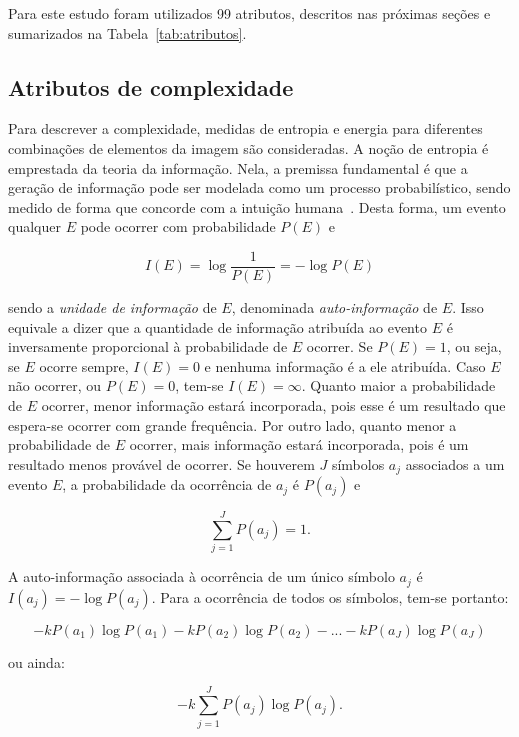 Para este estudo foram utilizados 99 atributos, descritos nas próximas seções e
sumarizados na Tabela~\ref{tab:atributos}.

\subsection{Atributos de complexidade}

Para descrever a complexidade, medidas de entropia e energia para diferentes
combinações de elementos da imagem são consideradas. A noção de entropia é
emprestada da teoria da informação. Nela, a premissa fundamental é que a
geração de informação pode ser modelada como um processo probabilístico, sendo
medido de forma que concorde com a intuição humana~\cite{gonzalez}. Desta forma,
um evento qualquer $E$ pode ocorrer com probabilidade $P(E)$ e

\begin{equation}
  I(E) = \log\frac{1}{P(E)} = -\log P(E)
\end{equation}

\noindent sendo a \emph{unidade de informação} de $E$, denominada
\emph{auto-informação} de $E$. Isso equivale a dizer que a quantidade de
informação atribuída ao evento $E$ é inversamente proporcional à probabilidade
de $E$ ocorrer. Se $P(E) = 1$, ou seja, se $E$ ocorre sempre, $I(E) = 0$ e
nenhuma informação é a ele atribuída. Caso $E$ não ocorrer, ou $P(E) = 0$,
tem-se $I(E) = \infty$. Quanto maior a probabilidade de $E$ ocorrer, menor
informação estará incorporada, pois esse é um resultado que espera-se ocorrer
com grande frequência. Por outro lado, quanto menor a probabilidade de $E$
ocorrer, mais informação estará incorporada, pois é um resultado menos provável
de ocorrer. Se houverem $J$ símbolos $a_j$ associados a um evento $E$, a
probabilidade da ocorrência de $a_j$ é $P(a_j)$ e

\begin{equation}
  \sum_{j=1}^J P(a_j) = 1.
\end{equation}

\noindent A auto-informação associada à ocorrência de um único símbolo $a_j$ é
$I(a_j) = -\log P(a_j)$. Para a ocorrência de todos os símbolos, tem-se portanto:

\begin{equation}
  -kP(a_1) \log P(a_1) -kP(a_2) \log P(a_2) -...-kP(a_J) \log P(a_J)
\end{equation}

\noindent ou ainda:

\begin{equation}
  -k \sum_{j=1}^J P(a_j) \log P(a_j).
\end{equation}

